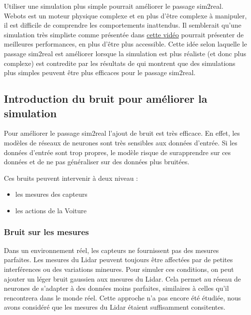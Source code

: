 \documentclass[french]{article}
\begin{document}
\vspace{0.5cm}

Utiliser une simulation plus simple pourrait améliorer le passage sim2real. Webots est un moteur physique complexe et en plus d'être complexe à manipuler, il est difficile de comprendre les comportements inattendus. Il semblerait qu'une simulation très simpliste comme présentée dans \href{https://www.youtube.com/watch?v=Cy155O5R1Oo&list=PLg2V2juOLiPWxd5fQOz1la37etAf9_WoW&index=4}{cette vidéo} pourrait présenter de meilleures performances, en plus d'être plus accessible. Cette idée selon laquelle le passage sim2real est améliorer lorsque la simulation est plus réaliste (et donc plus complexe) est contredite par les résultats de \cite{pmlr-v205-truong23a} qui montrent que des simulations plus simples peuvent être plus efficaces pour le passage sim2real.

\subsection{Introduction du bruit pour améliorer la simulation}
Pour améliorer le passage sim2real l'ajout de bruit est très efficace. En effet, les modèles de réseaux de neurones sont très sensibles aux données d'entrée. Si les données d'entrée sont trop propres, le modèle risque de surapprendre sur ces données et de ne pas généraliser sur des données plus bruitées.\vspace{0.5cm}

Ces bruits peuvent intervenir à deux niveau :
\begin{itemize}
    \item les mesures des capteurs 
    \item les actions de la Voiture
\end{itemize}

\subsubsection{Bruit sur les mesures}
Dans un environnement réel, les capteurs ne fournissent pas des mesures parfaites. Les mesures du Lidar peuvent 
toujours être affectées par de petites interférences ou des variations mineures. Pour simuler ces conditions, 
on peut ajouter un léger bruit gaussien aux mesures du Lidar. Cela permet au réseau de neurones de s'adapter 
à des données moins parfaites, similaires à celles qu'il rencontrera dans le monde réel. Cette approche n'a pas encore été étudiée, nous avons considéré que les mesures du Lidar étaient suffisamment consitentes.
\end{document}
